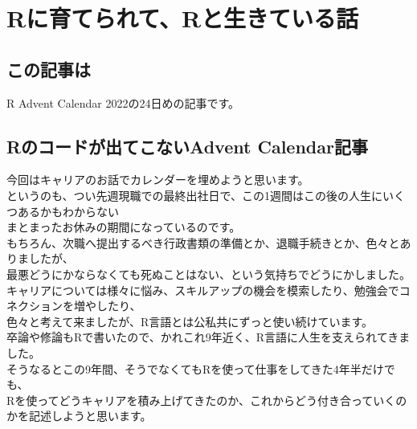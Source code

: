 \documentclass[
  letterpaper,
  DIV=11,
  numbers=noendperiod]{scrartcl}
\author{}
\date{}
\begin{document}
\ifdefined\Shaded\renewenvironment{Shaded}{\begin{tcolorbox}[breakable, borderline west={3pt}{0pt}{shadecolor}, boxrule=0pt, interior hidden, enhanced, sharp corners, frame hidden]}{\end{tcolorbox}}\fi

\hypertarget{rux306bux80b2ux3066ux3089ux308cux3066rux3068ux751fux304dux3066ux3044ux308bux8a71}{%
\section{Rに育てられて、Rと生きている話}\label{rux306bux80b2ux3066ux3089ux308cux3066rux3068ux751fux304dux3066ux3044ux308bux8a71}}

\hypertarget{ux3053ux306eux8a18ux4e8bux306f}{%
\subsection{この記事は}\label{ux3053ux306eux8a18ux4e8bux306f}}

R Advent Calendar 2022の24日めの記事です。

\hypertarget{rux306eux30b3ux30fcux30c9ux304cux51faux3066ux3053ux306aux3044advent-calendarux8a18ux4e8b}{%
\subsection{Rのコードが出てこないAdvent
Calendar記事}\label{rux306eux30b3ux30fcux30c9ux304cux51faux3066ux3053ux306aux3044advent-calendarux8a18ux4e8b}}

今回はキャリアのお話でカレンダーを埋めようと思います。\\
というのも、つい先週現職での最終出社日で、この1週間はこの後の人生にいくつあるかもわからない\\
まとまったお休みの期間になっているのです。\\
もちろん、次職へ提出するべき行政書類の準備とか、退職手続きとか、色々とありましたが、\\
最悪どうにかならなくても死ぬことはない、という気持ちでどうにかしました。\\
キャリアについては様々に悩み、スキルアップの機会を模索したり、勉強会でコネクションを増やしたり、\\
色々と考えて来ましたが、R言語とは公私共にずっと使い続けています。\\
卒論や修論もRで書いたので、かれこれ9年近く、R言語に人生を支えられてきました。\\
そうなるとこの9年間、そうでなくてもRを使って仕事をしてきた4年半だけでも、\\
Rを使ってどうキャリアを積み上げてきたのか、これからどう付き合っていくのかを記述しようと思います。
\end{document}
